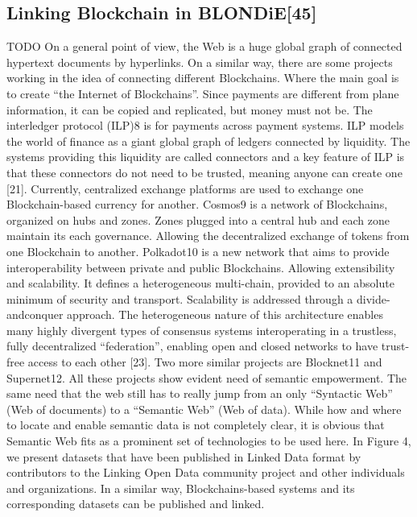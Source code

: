 \subsection{Linking Blockchain in BLONDiE[45]}TODO
On a general point of view, the Web is a huge global graph
of connected hypertext documents by hyperlinks. On a similar
way, there are some projects working in the idea of connecting
different Blockchains. Where the main goal is to create “the
Internet of Blockchains”. Since payments are different from
plane information, it can be copied and replicated, but money
must not be.
The interledger protocol (ILP)8 is for payments across
payment systems. ILP models the world of finance as a giant
global graph of ledgers connected by liquidity. The systems
providing this liquidity are called connectors and a key feature
of ILP is that these connectors do not need to be trusted,
meaning anyone can create one [21].
Currently, centralized exchange platforms are used to exchange
one Blockchain-based currency for another. Cosmos9
is a network of Blockchains, organized on hubs and zones.
Zones plugged into a central hub and each zone maintain
its each governance. Allowing the decentralized exchange of
tokens from one Blockchain to another.
Polkadot10 is a new network that aims to provide interoperability
between private and public Blockchains. Allowing
extensibility and scalability. It defines a heterogeneous
multi-chain, provided to an absolute minimum of security
and transport. Scalability is addressed through a divide-andconquer
approach. The heterogeneous nature of this architecture
enables many highly divergent types of consensus systems
interoperating in a trustless, fully decentralized “federation”,
enabling open and closed networks to have trust-free access
to each other [23].
Two more similar projects are Blocknet11 and Supernet12.
All these projects show evident need of semantic empowerment.
The same need that the web still has to really jump from
an only “Syntactic Web” (Web of documents) to a “Semantic
Web” (Web of data). While how and where to locate and
enable semantic data is not completely clear, it is obvious
that Semantic Web fits as a prominent set of technologies to
be used here. In Figure 4, we present datasets that have been
published in Linked Data format by contributors to the Linking
Open Data community project and other individuals and
organizations. In a similar way, Blockchains-based systems
and its corresponding datasets can be published and linked.

